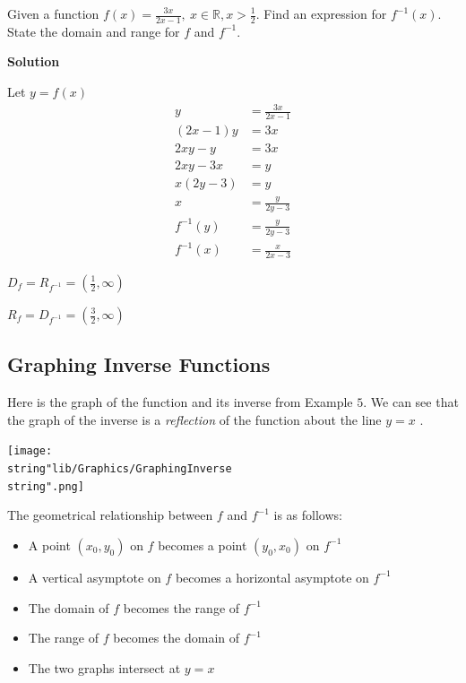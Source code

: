 \documentclass[11pt,a4paper]{book}
\newcommand{\R}{\mathbb{R}}
\begin{document}
\newpage

\begin{example}{}

Given a function ${\displaystyle f\left(x\right)=\frac{3x}{2x-1}},\:x\in\R,x>{\displaystyle \frac{1}{2}}$. Find an expression for $f^{-1}\left(x\right)$. State the domain and range for $f$ and $f^{-1}$.

\textbf{Solution}

Let ${\displaystyle y=f\left(x\right)}$
\begin{align*}
y & =\frac{3x}{2x-1}\\
\left(2x-1\right)y & =3x\\
2xy-y & =3x\\
2xy-3x & =y\\
x\left(2y-3\right) & =y\\
x & =\frac{y}{2y-3}\\
f^{-1}\left(y\right) & =\frac{y}{2y-3}\\
f^{-1}\left(x\right) & =\frac{x}{2x-3}
\end{align*}

${\displaystyle D_{f}=R_{f^{-1}}=\left(\frac{1}{2},\infty\right)}$

${\displaystyle R_{f}=D_{f^{-1}}=\left(\frac{3}{2},\infty\right)}$
\end{example}


\subsection{Graphing Inverse Functions}
\begin{minipage}{.6\textwidth}
Here is the graph of the function and its inverse from Example $5$. We can see that the graph of the inverse is a \textit{reflection} of the function about the line $y=x$ .
\end{minipage}
\begin{minipage}{.35\textwidth}
\begin{center}
\texttt{[image: \\string"lib/Graphics/GraphingInverse\\string".png]}
\par\end{center}
\end{minipage}
\begin{tcolorbox}[colback=blue!5, colframe=black,boxrule=.4pt, sharpish corners]

The geometrical relationship between $f$ and $f^{-1}$ is as follows:
\begin{itemize}
\item A point $\left(x_{0},y_{0}\right)$ on $f$ becomes a point $\left(y_{0},x_{0}\right)$
on $f^{-1}$
\item A vertical asymptote on $f$ becomes a horizontal asymptote on $f^{-1}$
\item The domain of $f$ becomes the range of $f^{-1}$
\item The range of $f$ becomes the domain of $f^{-1}$
\item The two graphs intersect at $y=x$
\end{itemize}
\end{tcolorbox}
\end{document}
